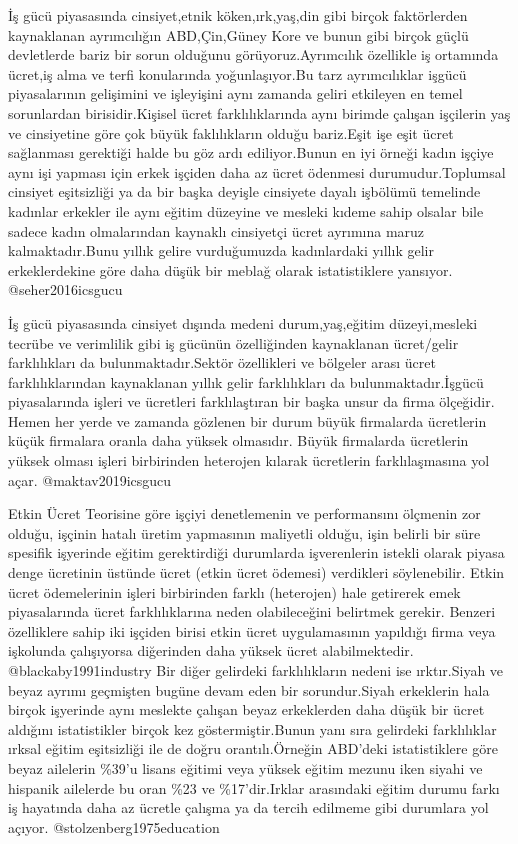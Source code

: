 \documentclass[
  12pt,
]{article}
\begin{document}
İş gücü piyasasında cinsiyet,etnik köken,ırk,yaş,din gibi birçok faktörlerden kaynaklanan ayrımcılığın ABD,Çin,Güney Kore ve bunun gibi birçok güçlü devletlerde bariz bir sorun olduğunu görüyoruz.Ayrımcılık özellikle iş ortamında ücret,iş alma ve terfi konularında yoğunlaşıyor.Bu tarz ayrımcılıklar işgücü piyasalarının gelişimini ve işleyişini aynı zamanda geliri etkileyen en temel sorunlardan birisidir.Kişisel ücret farklılıklarında aynı birimde çalışan işçilerin yaş ve cinsiyetine göre çok büyük faklılıkların olduğu bariz.Eşit işe eşit ücret sağlanması gerektiği halde bu göz ardı ediliyor.Bunun en iyi örneği kadın işçiye aynı işi yapması için erkek işçiden daha az ücret ödenmesi durumudur.Toplumsal cinsiyet eşitsizliği ya da bir başka deyişle cinsiyete dayalı işbölümü temelinde kadınlar erkekler ile aynı eğitim düzeyine ve mesleki kıdeme sahip olsalar bile sadece kadın olmalarından kaynaklı cinsiyetçi ücret ayrımına maruz kalmaktadır.Bunu yıllık gelire vurduğumuzda kadınlardaki yıllık gelir erkeklerdekine göre daha düşük bir meblağ olarak istatistiklere yansıyor. @seher2016icsgucu

İş gücü piyasasında cinsiyet dışında medeni durum,yaş,eğitim düzeyi,mesleki tecrübe ve verimlilik gibi iş gücünün özelliğinden kaynaklanan ücret/gelir farklılıkları da bulunmaktadır.Sektör özellikleri ve bölgeler arası ücret farklılıklarından kaynaklanan yıllık gelir farklılıkları da bulunmaktadır.İşgücü piyasalarında işleri ve ücretleri farklılaştıran bir başka unsur da firma ölçeğidir. Hemen her yerde ve zamanda gözlenen bir durum büyük firmalarda ücretlerin küçük firmalara oranla daha yüksek olmasıdır. Büyük firmalarda ücretlerin yüksek olması işleri birbirinden heterojen kılarak ücretlerin farklılaşmasına yol açar. @maktav2019icsgucu

Etkin Ücret Teorisine göre işçiyi denetlemenin ve performansını ölçmenin zor olduğu, işçinin hatalı üretim yapmasının maliyetli olduğu, işin belirli bir süre spesifik işyerinde eğitim gerektirdiği durumlarda işverenlerin istekli olarak piyasa denge ücretinin üstünde ücret (etkin ücret ödemesi) verdikleri söylenebilir. Etkin ücret ödemelerinin işleri birbirinden farklı (heterojen) hale getirerek emek piyasalarında ücret farklılıklarına neden olabileceğini belirtmek gerekir. Benzeri özelliklere sahip iki işçiden birisi etkin ücret uygulamasının yapıldığı firma veya işkolunda çalışıyorsa diğerinden daha yüksek ücret alabilmektedir. @blackaby1991industry
Bir diğer gelirdeki farklılıkların nedeni ise ırktır.Siyah ve beyaz ayrımı geçmişten bugüne devam eden bir sorundur.Siyah erkeklerin hala birçok işyerinde aynı meslekte çalışan beyaz erkeklerden daha düşük bir ücret aldığını istatistikler birçok kez göstermiştir.Bunun yanı sıra gelirdeki farklılıklar ırksal eğitim eşitsizliği ile de doğru orantılı.Örneğin ABD'deki istatistiklere göre beyaz ailelerin \%39'u lisans eğitimi veya yüksek eğitim mezunu iken siyahi ve hispanik ailelerde bu oran \%23 ve \%17'dir.Irklar arasındaki eğitim durumu farkı iş hayatında daha az ücretle çalışma ya da tercih edilmeme gibi durumlara yol açıyor. @stolzenberg1975education
\end{document}
